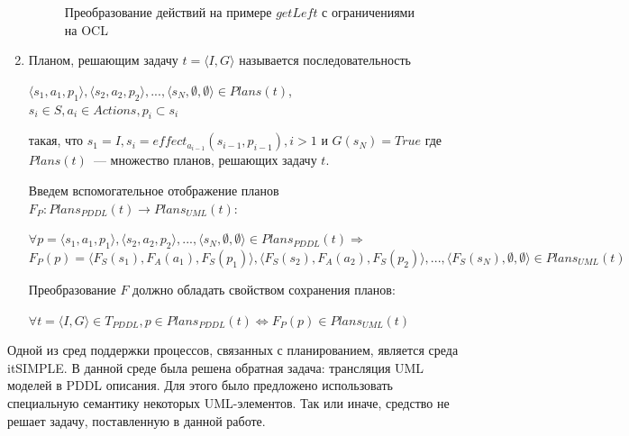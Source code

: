 \documentclass[a4paper,14pt]{extreport}
\begin{document}
\begin{enumerate}
\begin{figure}[h]
    \begin{center}
        \begin{minipage}{0.8\linewidth}
            \caption{Преобразование действий  на примере $getLeft$ с ограничениями на OCL}
        \end{minipage}    
    \end{center}

    \label{img:property-actions}
\end{figure}      

    \item
        Планом, решающим задачу $t = \langle I, G \rangle$ называется последовательность 
        \begin{center}
            $\langle s_1, a_1, p_1  \rangle, \langle s_2, a_2, p_2  \rangle, ..., \langle s_N, \emptyset, \emptyset \rangle \in Plans(t)$, \\ $s_i \in S, a_i \in Actions, p_i \subset s_i$
        \end{center}
        такая, что $s_1 = I, s_i = effect_{a_{i-1}}(s_{i-1}, p_{i-1}), i > 1$ и $G(s_N) = True$ где $Plans(t)$~--- множество планов, решающих задачу $t$.      
        
       
        Введем вспомогательное отображение планов $F_P: Plans_{PDDL}(t) \rightarrow Plans_{UML}(t)$:
            \begin{center}
                $\forall p = \langle s_1, a_1, p_1  \rangle, \langle s_2, a_2, p_2  \rangle, ..., \langle s_N, \emptyset, \emptyset  \rangle \in Plans_{PDDL}(t) \Rightarrow $\\
            $F_P(p) = \langle F_S(s_1), F_A(a_1), F_S(p_1)  \rangle, \langle F_S(s_2), F_A(a_2), F_S(p_2)  \rangle, ..., \langle F_S(s_N), \emptyset, \emptyset  \rangle \in Plans_{UML}(t) $  
            \end{center}
            
        Преобразование $F$ должно обладать свойством сохранения планов:
        
        \begin{center}
            $\forall t = \langle I, G\rangle \in T_{PDDL}, p \in Plans_{PDDL}(t) 
            \Leftrightarrow F_P(p) \in Plans_{UML}(t) $

        \end{center}
    \end{enumerate}
    
    Одной из сред поддержки процессов, связанных с планированием, является среда itSIMPLE\cite{itsimple}. В данной среде была решена обратная задача: трансляция UML моделей в PDDL описания. Для этого было предложено использовать специальную семантику некоторых UML-элементов. Так или иначе, средство не решает задачу, поставленную в данной работе.
    
\end{document}
